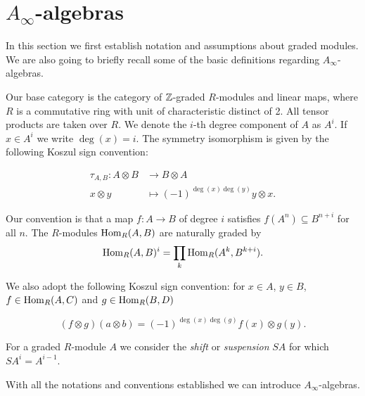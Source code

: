 \documentclass[Thesis.tex]{subfiles}
\begin{document}
\section{$A_\infty$-algebras}








In this section we first establish notation and assumptions about graded modules. We are also going to briefly recall some of the basic definitions regarding $A_\infty$-algebras.

Our base category is the category of $\mathbb{Z}$-graded $R$-modules and linear maps, where $R$ is a commutative ring with unit of characteristic distinct of 2. All tensor products are taken over $R$. We denote the $i$-th degree component of $A$ as $A^i$. If $x\in A^i$ we write $\deg(x)=i$. The symmetry isomorphism is given by the following Koszul sign convention:

\begin{align*}
\tau_{A,B}:A\otimes B&\to B\otimes A\\
x\otimes y &\mapsto (-1)^{\deg(x)\deg(y)}y\otimes x.
\end{align*}

 Our convention is that a map $f:A\to B$ of degree $i$ satisfies $f(A^n)\subseteq B^{n+i}$ for all $n$. The $R$-modules $\operatorname{Hom}_R(A,B)$ are naturally graded by \[\operatorname{Hom}_R(A,B)^i=\prod_k\operatorname{Hom}_R(A^k,B^{k+i}).\]

We also adopt the following Koszul sign convention: for $x\in A$, $y\in B$, $f\in\operatorname{Hom}_R(A,C)$ and $g\in\operatorname{Hom}_R(B,D)$

\[(f\otimes g)(a\otimes b)=(-1)^{\deg(x)\deg(g)}f(x)\otimes g(y).\]


\begin{defin}
For a graded $R$-module $A$ we consider the \emph{shift} or \emph{suspension} $SA$ for which $SA^i=A^{i-1}$. %
\end{defin}

With all the notations and conventions established we can introduce $A_\infty$-algebras. 
\end{document}
